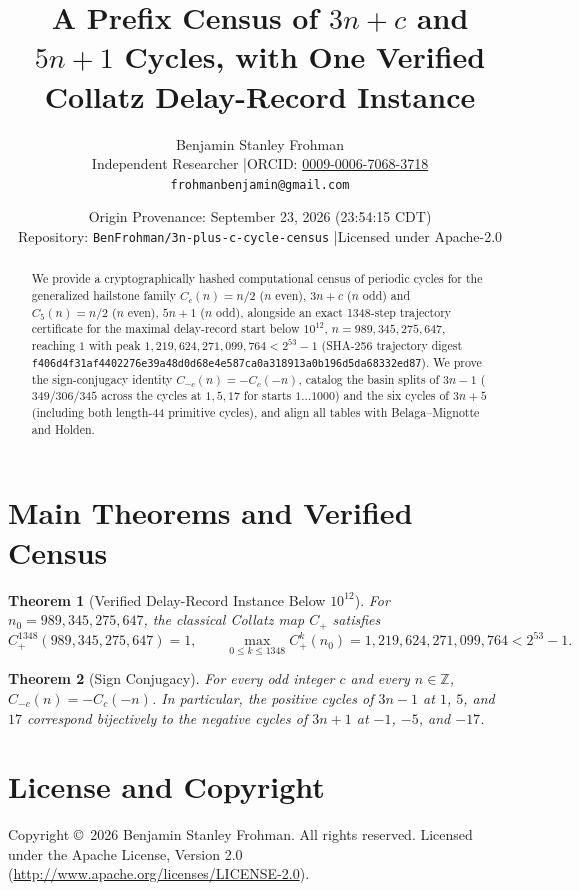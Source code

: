 \documentclass[11pt]{article}
\title{\textbf{A Prefix Census of $3n+c$ and $5n+1$ Cycles, with One Verified Collatz Delay-Record Instance}}
\author{Benjamin Stanley Frohman\\
\small Independent Researcher \quad|\quad ORCID: \href{https://orcid.org/0009-0006-7068-3718}{0009-0006-7068-3718}\\
\small \texttt{frohmanbenjamin@gmail.com}}
\date{Origin Provenance: September 23, 2026 (23:54:15 CDT) \\ \small Repository: \texttt{BenFrohman/3n-plus-c-cycle-census} \quad|\quad Licensed under Apache-2.0}
\newtheorem{theorem}{Theorem}
\begin{document}
\maketitle

\begin{abstract}
We provide a cryptographically hashed computational census of periodic cycles for the generalized hailstone family $C_c(n) = n/2$ ($n$ even), $3n+c$ ($n$ odd) and $C_5(n) = n/2$ ($n$ even), $5n+1$ ($n$ odd), alongside an exact 1348-step trajectory certificate for the maximal delay-record start below $10^{12}$, $n = 989{,}345{,}275{,}647$, reaching $1$ with peak $1{,}219{,}624{,}271{,}099{,}764 < 2^{53}-1$ (SHA-256 trajectory digest \texttt{f406d4f31af4402276e39a48d0d68e4e587ca0a318913a0b196d5da68332ed87}). We prove the sign-conjugacy identity $C_{-c}(n) = -C_c(-n)$, catalog the basin splits of $3n-1$ ($349/306/345$ across the cycles at $1, 5, 17$ for starts $1\dots 1000$) and the six cycles of $3n+5$ (including both length-44 primitive cycles), and align all tables with Belaga--Mignotte and Holden.
\end{abstract}

\section{Main Theorems and Verified Census}
\begin{theorem}[Verified Delay-Record Instance Below $10^{12}$]
For $n_0 = 989{,}345{,}275{,}647$, the classical Collatz map $C_+$ satisfies
\[
C_+^{1348}(989{,}345{,}275{,}647) = 1, \qquad \max_{0 \le k \le 1348} C_+^k(n_0) = 1{,}219{,}624{,}271{,}099{,}764 < 2^{53}-1.
\]
\end{theorem}

\begin{theorem}[Sign Conjugacy]
For every odd integer $c$ and every $n \in \mathbb{Z}$, $C_{-c}(n) = -C_c(-n)$. In particular, the positive cycles of $3n-1$ at $1$, $5$, and $17$ correspond bijectively to the negative cycles of $3n+1$ at $-1$, $-5$, and $-17$.
\end{theorem}

\section*{License and Copyright}
Copyright \copyright\ 2026 Benjamin Stanley Frohman. All rights reserved. Licensed under the Apache License, Version 2.0 (\url{http://www.apache.org/licenses/LICENSE-2.0}).
\end{document}
